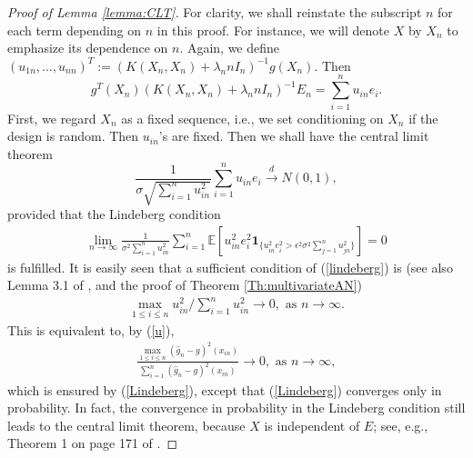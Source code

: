 \documentclass[12pt]{article}
\theoremstyle{plain}
\theoremstyle{remark}
\begin{document}
\begin{proof}[Proof of Lemma \ref{lemma:CLT}]
    For clarity, we shall reinstate the subscript $n$ for each term depending on $n$ in this proof. For instance, we will denote $X$ by $X_n$ to emphasize its dependence on $n$.
    Again, we define $(u_{1n},\ldots,u_{nn})^T:=(K(X_n,X_n)+\lambda_n nI_n)^{-1}g(X_n)$. Then
    \[g^T(X_n)(K(X_n,X_n)+\lambda_n n I_n)^{-1}E_n=\sum_{i=1}^n u_{in} e_{i}.\]
    First, we regard $X_n$ as a fixed sequence, i.e., we set conditioning on $X_n$ if the design is random. Then $u_{in}$'s are fixed. Then we shall have the central limit theorem
    \[\frac{1}{\sigma\sqrt{\sum_{i=1}^n u_{in}^2}}\sum_{i=1}^n u_{in}e_i\xrightarrow{d} N(0,1),\]
    provided that the Lindeberg condition
    \begin{eqnarray}\label{lindeberg}
        \lim_{n\rightarrow \infty}\frac{1}{\sigma^2\sum_{i=1}^n u_{in}^2}\sum_{i=1}^n \mathbb{E}\left[u_{in}^2 e_i^2 \mathbf{1}_{\{u_{in}^2e_i^2>\epsilon^2 \sigma^2 \sum_{j=1}^n u_{jn}^2\}}\right]=0
    \end{eqnarray}
    is fulfilled. It is easily seen that a sufficient condition of (\ref{lindeberg}) is (see also Lemma 3.1 of \cite{huang2003local}, and the proof of Theorem \ref{Th:multivariateAN})
    \begin{eqnarray}\label{lindebergsufficient}
        \max_{1\leq i\leq n}u_{in}^2/\sum_{i=1}^n u_{in}^2\rightarrow 0, \text{ as } n\rightarrow \infty.
    \end{eqnarray}
    This is equivalent to, by (\ref{u}),
    \begin{eqnarray}\label{pointwise}
        \frac{\max_{1\leq i\leq n}(\hat{g}_n-g)^2(x_{in})}{\sum_{i=1}^n(\hat{g}_n-g)^2(x_{in})}\rightarrow 0, \text{ as } n\rightarrow\infty,
    \end{eqnarray}
    which is ensured by (\ref{Lindeberg}), except that (\ref{Lindeberg}) converges only in probability. 
    In fact, the convergence in probability in the Lindeberg condition still leads to the central limit theorem, because $X$ is independent of $E$; see, e.g., Theorem 1 on page 171 of \cite{pollard1984convergence}.
\end{proof}
\end{document}
